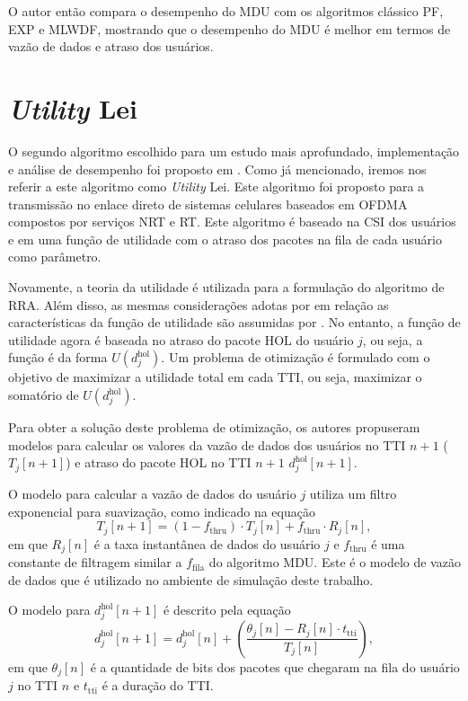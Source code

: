 O autor então compara o desempenho do MDU com os algoritmos clássico PF, EXP e MLWDF, mostrando que o desempenho do MDU é melhor em termos de vazão de dados e atraso dos usuários.

\section{\textit{Utility} Lei}

O segundo algoritmo escolhido para um estudo mais aprofundado, implementação e análise de desempenho foi proposto em . Como já mencionado, iremos nos referir a este algoritmo como \textit{Utility} Lei. Este algoritmo foi proposto para a transmissão no enlace direto de sistemas celulares baseados em OFDMA compostos por serviços NRT e RT. Este algoritmo é baseado na CSI dos usuários e em uma função de utilidade com o atraso dos pacotes na fila de cada usuário como parâmetro.

Novamente, a teoria da utilidade é utilizada para a formulação do algoritmo de RRA. Além disso, as mesmas considerações adotas por  em relação as características da função de utilidade são assumidas por . No entanto, a função de utilidade agora é baseada no atraso do pacote HOL do usuário $j$, ou seja, a função é da forma $U(d_{j}^{\text{hol}})$. Um problema de otimização é formulado com o objetivo de maximizar a utilidade total em cada TTI, ou seja, maximizar o somatório de $U(d_{j}^{\text{hol}})$.

Para obter a solução deste problema de otimização, os autores propuseram modelos para calcular os valores da vazão de dados dos usuários no TTI $n+1$ ($T_{j}\left[n+1\right]$) e atraso do pacote HOL no TTI $n+1$ $d_{j}^{\text{hol}}[n + 1]$. 

O modelo para calcular a vazão de dados do usuário $j$ utiliza um filtro exponencial para suavização, como indicado na equação 
%
\begin{equation}
\label{Eq:Thru}
T_{j}\left[n+1\right] = \left(1 - f_{\mathrm{thru}}\right) \cdot T_{j}\left[n\right] + f_{\mathrm{thru}} \cdot R_j\left[n\right],
\end{equation} 
%
em que $R_j\left[n\right]$ é a taxa instantânea de dados do usuário $j$ e $f_{\mathrm{thru}}$ é uma constante de filtragem similar a $f_{\mathrm{fila}}$ do algoritmo MDU. Este é o modelo de vazão de dados que é utilizado no ambiente de simulação deste trabalho.

O modelo para $d_{j}^{\text{hol}}[n + 1]$ é descrito pela equação 
%
\begin{equation}
\label{JSM:Eq:HOL_Delay}
d_{j}^\mathrm{hol}\left[n+1\right] = d_{j}^\mathrm{hol}\left[n\right] + \left( \frac{\theta_j\left[n\right] - R_j\left[n\right] \cdot t_{\mathrm{tti}}}{T_{j}\left[n\right]}\right),
\end{equation}
%
em que $\theta_j\left[n\right]$ é a quantidade de bits dos pacotes que chegaram na fila do usuário $j$ no TTI $n$ e $t_{\mathrm{tti}}$ é a duração do TTI.

